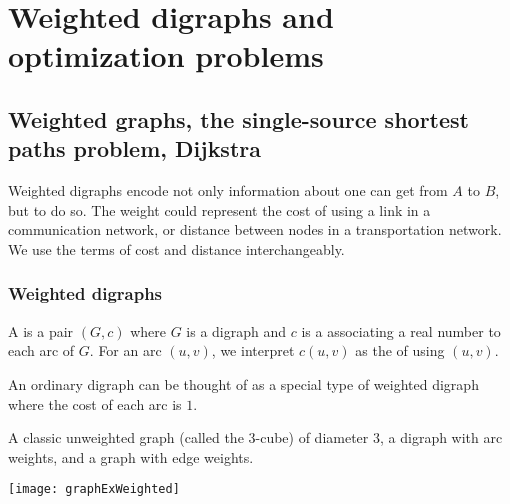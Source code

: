 \part{Weighted digraphs and optimization problems}
\label{ch:weighted}

\chapter{Weighted graphs, the single-source shortest paths problem, Dijkstra} %
Weighted digraphs encode not only information about  one can get from $A$ to $B$,
but  to do so.
The weight could represent the cost of using a link in a communication network, 
or distance between nodes in a transportation network. 
We use the terms of cost and distance interchangeably.


\section{Weighted digraphs} \label{sec:weighted}
\begin{Definition}
A  is a pair $(G, c)$ where $G$ is a digraph
and $c$ is a  associating a real number to each arc of $G$. 
For an arc $(u,v)$, we interpret  $c(u, v)$ as the  of using $(u, v)$.
\end{Definition}

An ordinary digraph can be thought of as a special type of weighted digraph 
where the cost of each arc is $1$. 

\begin{Boxample} \label{ex:graphExWeighted}
A classic unweighted graph (called the $3$-cube) of diameter $3$, a digraph with arc weights, 
and a graph with edge weights.
\begin{center}
 \texttt{[image: graphExWeighted]}
\end{center}
\end{Boxample}

